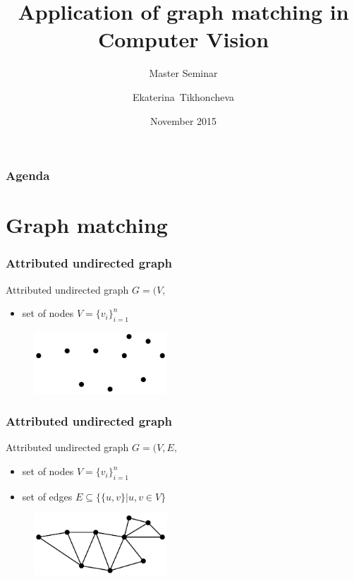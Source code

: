 \documentclass[hyperref={pdfpagelabels=false}]{beamer}
\title[Application of graph matching in Computer Vision]
	{Application of graph matching in Computer Vision}
\subtitle{Master Seminar}
\author[E.~Tikhoncheva] %
	{Ekaterina~Tikhoncheva}
\institute[Universities Here and There] %
	{University of Heidelberg\\
	Faculty of Mathematics and Computer Science \\
	Computer Vision group \\
	at\\
	Heidelberg Collaboratory for Image Processing
}
\date[2015]{November 2015}
\begin{document}
\begin{frame}
\titlepage
\end{frame}
\begin{frame}
\frametitle{Agenda}
\tableofcontents
\end{frame} 
\section{Graph matching} 

\begin{frame}[allowframebreaks]
\frametitle{Attributed undirected graph}

Attributed undirected graph $G=(V,$
\begin{itemize}
\item set of nodes $V=\{v_i\}_{i=1}^{n}$
\end{itemize}
\vspace{2cm}
\begin{figure}[b]
    \centering
    \includegraphics[width=5cm]{fig/graph_1_nodes.pdf}
\end{figure}%
\framebreak
\frametitle{Attributed undirected graph}
Attributed undirected graph $G=(V,E,$
\begin{itemize}
\item set of nodes $V=\{v_i\}_{i=1}^{n}$
\item set of edges $E\subseteq\{\{u,v\}| u, v\in V\}$
\end{itemize}
\vspace{1.5cm}
\begin{figure}[b]
    \centering
    \includegraphics[width=5cm]{fig/graph_1.pdf}
\end{figure}%
\end{frame}
\end{document}
